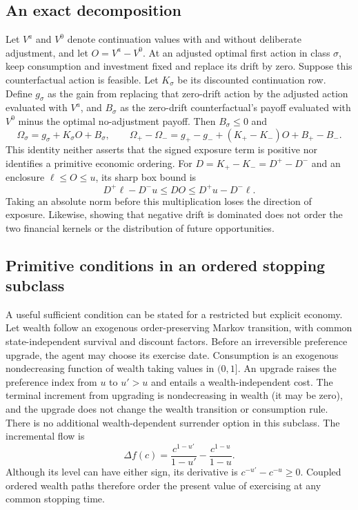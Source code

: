 \subsection{An exact decomposition}
Let $V^a$ and $V^0$ denote continuation values with and without deliberate adjustment, and let $O=V^a-V^0$. At an adjusted optimal first action in class $\sigma$, keep consumption and investment fixed and replace its drift by zero. Suppose this counterfactual action is feasible. Let $K_\sigma$ be its discounted continuation row. Define $g_\sigma$ as the gain from replacing that zero-drift action by the adjusted action evaluated with $V^a$, and $B_\sigma$ as the zero-drift counterfactual's payoff evaluated with $V^0$ minus the optimal no-adjustment payoff. Then $B_\sigma\leq0$ and
\begin{equation}
 \Omega_\sigma=g_\sigma+K_\sigma O+B_\sigma,\qquad
 \Omega_+-\Omega_-=g_+-g_-+(K_+-K_-)O+B_+-B_-.
 \label{eq:exposure}
\end{equation}
This identity neither asserts that the signed exposure term is positive nor identifies a primitive economic ordering. For $D=K_+-K_-=D^+-D^-$ and an enclosure $\ell\leq O\leq u$, its sharp box bound is
\begin{equation}
 D^+\ell-D^-u\leq DO\leq D^+u-D^-\ell.
 \label{eq:signedexposure}
\end{equation}
Taking an absolute norm before this multiplication loses the direction of exposure. Likewise, showing that negative drift is dominated does not order the two financial kernels or the distribution of future opportunities.

\subsection{Primitive conditions in an ordered stopping subclass}
A useful sufficient condition can be stated for a restricted but explicit economy. Let wealth follow an exogenous order-preserving Markov transition, with common state-independent survival and discount factors. Before an irreversible preference upgrade, the agent may choose its exercise date. Consumption is an exogenous nondecreasing function of wealth taking values in $(0,1]$. An upgrade raises the preference index from $u$ to $u'>u$ and entails a wealth-independent cost. The terminal increment from upgrading is nondecreasing in wealth (it may be zero), and the upgrade does not change the wealth transition or consumption rule. There is no additional wealth-dependent surrender option in this subclass. The incremental flow is
\begin{equation}
 \Delta f(c)=\frac{c^{1-u'}}{1-u'}-\frac{c^{1-u}}{1-u}.
\end{equation}
Although its level can have either sign, its derivative is $c^{-u'}-c^{-u}\geq0$. Coupled ordered wealth paths therefore order the present value of exercising at any common stopping time.

